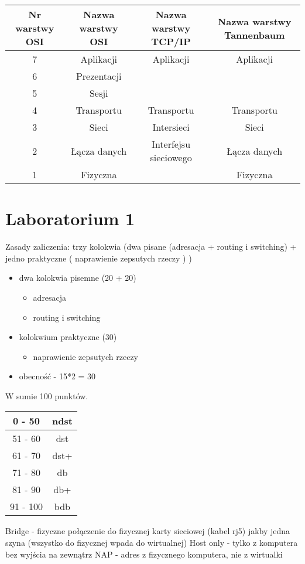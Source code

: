 \documentclass[a4paper]{article}
\begin{document}
\begin{tabular}{|c|c|c|c| }
\hline
Nr warstwy OSI & Nazwa warstwy OSI & Nazwa warstwy TCP/IP & Nazwa warstwy Tannenbaum\\
\hline
7 & Aplikacji & Aplikacji & Aplikacji\\
6 & Prezentacji & & \\
5 & Sesji & & \\
4 & Transportu & Transportu & Transportu\\
3 & Sieci & Intersieci & Sieci\\
2 & Łącza danych & Interfejsu sieciowego & Łącza danych\\
1 & Fizyczna & & Fizyczna\\
\hline
\end{tabular}



\section{Laboratorium 1}
Zasady zaliczenia: trzy kolokwia (dwa pisane (adresacja + routing i switching)  + jedno praktyczne ( naprawienie zepsutych rzeczy ) )
\begin{itemize}
    \item dwa kolokwia pisemne (20 + 20)
    \begin{itemize}
        \item adresacja
        \item routing i switching
    \end{itemize}
    \item kolokwium praktyczne (30)
    \begin{itemize}
        \item naprawienie zepsutych rzeczy
    \end{itemize}
    \item obecność - 15*2 = 30
\end{itemize}
W sumie 100 punktów.

\begin{tabular}{|c|c|}
\hline
0 - 50 & ndst\\
\hline
51 - 60 & dst\\
\hline
61 - 70 & dst+\\
\hline
71 - 80 & db\\
\hline
81 - 90 & db+\\
\hline
91 - 100 & bdb\\
\hline
\end{tabular}


Bridge - fizyczne połączenie do fizycznej karty sieciowej (kabel rj5) jakby jedna szyna (wszystko do fizycznej wpada do wirtualnej)
Host only - tylko z komputera bez wyjścia na zewnątrz
NAP - adres z fizycznego komputera, nie z wirtualki
\end{document}
